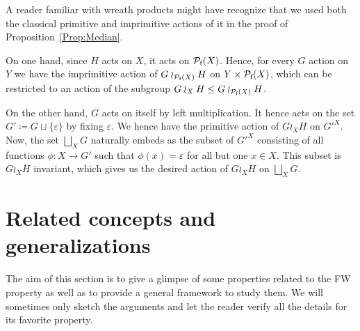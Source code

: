 \begin{rem}\label{Rem:Actions}
A reader familiar with wreath products might have recognize that we used both the classical primitive and imprimitive actions of it in the proof of Proposition~\ref{Prop:Median}.

On one hand, since $H$ acts on $X$, it acts on $\mathcal P_{\textnormal{f}}(X)$.
Hence, for every $G$ action on $Y$ we have the imprimitive action of $G\wr_{\mathcal P_{\textnormal{f}}(X)} H$ on $Y\times \mathcal P_{\textnormal{f}}(X)$, which can be restricted to an action of the subgroup $G\wr_{X} H\leq G\wr_{\mathcal P_{\textnormal{f}}(X)} H$.

On the other hand, $G$ acts on itself by left multiplication.
It hence acts on the set $G'\coloneqq G\sqcup\{\varepsilon\}$ by fixing $\varepsilon$.
We hence have the primitive action of $G\wr_{X} H$ on $G'^X$.
Now, the set $\bigsqcup_XG$ naturally embeds as the subset of $G'^X$ consisting of all functions $\phi\colon X\to G'$ such that $\phi(x)=\varepsilon$ for all but one $x\in X$.
This subset is $G\wr_{X} H$ invariant, which gives us the desired action of $G\wr_{X} H$ on $\bigsqcup_XG$.
\end{rem}




\section{Related concepts and generalizations}\label{Section:Generalizations}

The aim of this section is to give a glimpse of some properties related to the FW property as well as to provide a general framework to study them.
We will sometimes only sketch the arguments and let the reader verify all the details for its favorite property.

